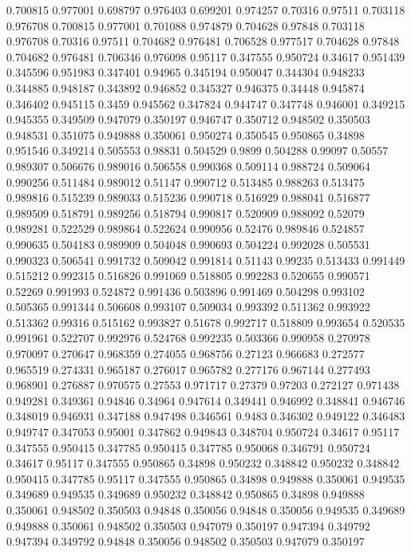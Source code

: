 0.700815 0.977001
0.698797 0.976403
0.699201 0.974257
0.70316 0.97511
0.703118 0.976708
0.700815 0.977001
0.701088 0.974879
0.704628 0.97848
0.703118 0.976708
0.70316 0.97511
0.704682 0.976481
0.706528 0.977517
0.704628 0.97848
0.704682 0.976481
0.706346 0.976098
0.95117 0.347555
0.950724 0.34617
0.951439 0.345596
0.951983 0.347401
0.94965 0.345194
0.950047 0.344304
0.948233 0.344885
0.948187 0.343892
0.946852 0.345327
0.946375 0.34448
0.945874 0.346402
0.945115 0.3459
0.945562 0.347824
0.944747 0.347748
0.946001 0.349215
0.945355 0.349509
0.947079 0.350197
0.946747 0.350712
0.948502 0.350503
0.948531 0.351075
0.949888 0.350061
0.950274 0.350545
0.950865 0.34898
0.951546 0.349214
0.505553 0.98831
0.504529 0.9899
0.504288 0.99097
0.50557 0.989307
0.506676 0.989016
0.506558 0.990368
0.509114 0.988724
0.509064 0.990256
0.511484 0.989012
0.51147 0.990712
0.513485 0.988263
0.513475 0.989816
0.515239 0.989033
0.515236 0.990718
0.516929 0.988041
0.516877 0.989509
0.518791 0.989256
0.518794 0.990817
0.520909 0.988092
0.52079 0.989281
0.522529 0.989864
0.522624 0.990956
0.52476 0.989846
0.524857 0.990635
0.504183 0.989909
0.504048 0.990693
0.504224 0.992028
0.505531 0.990323
0.506541 0.991732
0.509042 0.991814
0.51143 0.99235
0.513433 0.991449
0.515212 0.992315
0.516826 0.991069
0.518805 0.992283
0.520655 0.990571
0.52269 0.991993
0.524872 0.991436
0.503896 0.991469
0.504298 0.993102
0.505365 0.991344
0.506608 0.993107
0.509034 0.993392
0.511362 0.993922
0.513362 0.99316
0.515162 0.993827
0.51678 0.992717
0.518809 0.993654
0.520535 0.991961
0.522707 0.992976
0.524768 0.992235
0.503366 0.990958
0.270978 0.970097
0.270647 0.968359
0.274055 0.968756
0.27123 0.966683
0.272577 0.965519
0.274331 0.965187
0.276017 0.965782
0.277176 0.967144
0.277493 0.968901
0.276887 0.970575
0.27553 0.971717
0.27379 0.97203
0.272127 0.971438
0.949281 0.349361
0.94846 0.34964
0.947614 0.349441
0.946992 0.348841
0.946746 0.348019
0.946931 0.347188
0.947498 0.346561
0.9483 0.346302
0.949122 0.346483
0.949747 0.347053
0.95001 0.347862
0.949843 0.348704
0.950724 0.34617
0.95117 0.347555
0.950415 0.347785
0.950415 0.347785
0.950068 0.346791
0.950724 0.34617
0.95117 0.347555
0.950865 0.34898
0.950232 0.348842
0.950232 0.348842
0.950415 0.347785
0.95117 0.347555
0.950865 0.34898
0.949888 0.350061
0.949535 0.349689
0.949535 0.349689
0.950232 0.348842
0.950865 0.34898
0.949888 0.350061
0.948502 0.350503
0.94848 0.350056
0.94848 0.350056
0.949535 0.349689
0.949888 0.350061
0.948502 0.350503
0.947079 0.350197
0.947394 0.349792
0.947394 0.349792
0.94848 0.350056
0.948502 0.350503
0.947079 0.350197
